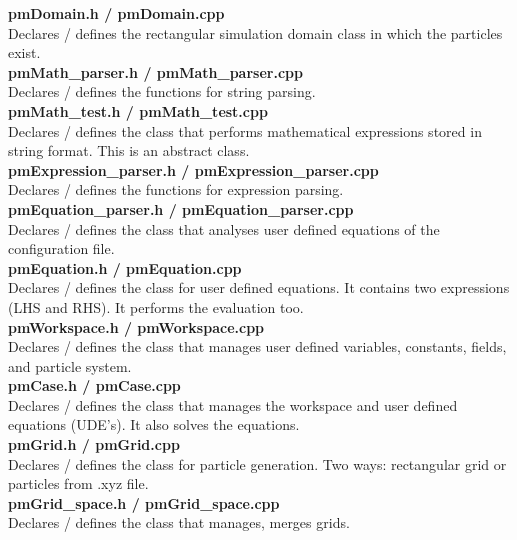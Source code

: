 \documentclass[a4paper,12pt,openany]{book}
\theoremstyle{break}
\begin{document}
\textbf{pmDomain.h / pmDomain.cpp} \\
Declares / defines the rectangular simulation domain class in which the particles exist. \\

\textbf{pmMath\_parser.h / pmMath\_parser.cpp} \\
Declares / defines the functions for string parsing. \\

\textbf{pmMath\_test.h / pmMath\_test.cpp} \\
Declares / defines the class that performs mathematical expressions stored in string format. This is an abstract class. \\

\textbf{pmExpression\_parser.h / pmExpression\_parser.cpp} \\
Declares / defines the functions for expression parsing. \\

\textbf{pmEquation\_parser.h / pmEquation\_parser.cpp} \\
Declares / defines the class that analyses user defined equations of the configuration file. \\

\textbf{pmEquation.h / pmEquation.cpp} \\
Declares / defines the class for user defined equations. It contains two expressions (LHS and RHS). It performs the evaluation too. \\

\textbf{pmWorkspace.h / pmWorkspace.cpp} \\
Declares / defines the class that manages user defined variables, constants, fields, and particle system. \\

\textbf{pmCase.h / pmCase.cpp} \\
Declares / defines the class that manages the workspace and user defined equations (UDE's). It also solves the equations. \\

\textbf{pmGrid.h / pmGrid.cpp} \\
Declares / defines the class for particle generation. Two ways: rectangular grid or particles from .xyz file. \\

\textbf{pmGrid\_space.h / pmGrid\_space.cpp} \\
Declares / defines the class that manages, merges grids. \\
\end{document}
